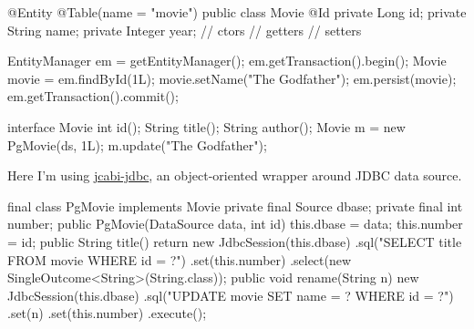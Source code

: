 \documentclass{article}
\begin{document}


\begin{pptWide}{2}
{\small\begin{ffcode}
@Entity
@Table(name = "movie")
public class Movie {
  @Id
  private Long id;
  private String name;
  private Integer year;
  // ctors
  // getters
  // setters
}
\end{ffcode}
}
\par\columnbreak\par
{\small\begin{ffcode}
EntityManager em = getEntityManager();
em.getTransaction().begin();
Movie movie = em.findById(1L);
movie.setName("The Godfather");
em.persist(movie);
em.getTransaction().commit();
\end{ffcode}
}
\end{pptWide}
\par
\plush{}

\begin{pptWide}{2}
{\small\begin{ffcode}
interface Movie {
  int id();
  String title();
  String author();
}
Movie m = new PgMovie(ds, 1L);
m.update("The Godfather");
\end{ffcode}
}
\par
Here I'm using \href{https://github.com/jcabi/jcabi-jdbc}{jcabi-jdbc},
an object-oriented wrapper around JDBC data source.
\par\columnbreak\par
{\scriptsize\begin{ffcode}
final class PgMovie implements Movie
  private final Source dbase;
  private final int number;
  public PgMovie(DataSource data, int id)
    this.dbase = data;
    this.number = id;
  public String title()
    return new JdbcSession(this.dbase)
      .sql("SELECT title FROM movie WHERE id = ?")
      .set(this.number)
      .select(new SingleOutcome<String>(String.class));
  public void rename(String n)
    new JdbcSession(this.dbase)
      .sql("UPDATE movie SET name = ? WHERE id = ?")
      .set(n)
      .set(this.number)
      .execute();
\end{ffcode}
}
\end{pptWide}
\par
\plush{}
\end{document}
